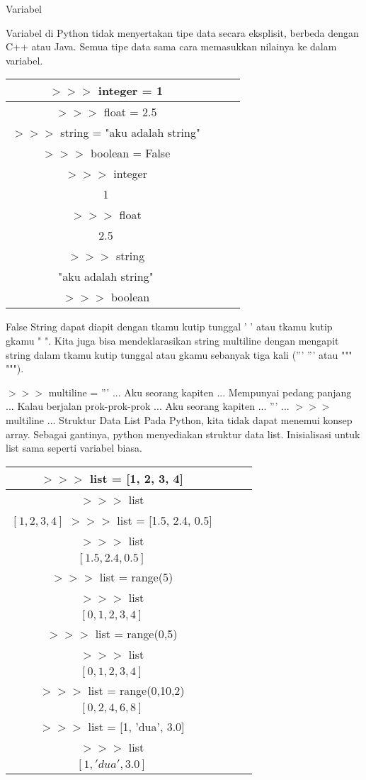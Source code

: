 Variabel

Variabel di Python tidak menyertakan tipe data secara eksplisit, berbeda dengan C++ atau Java. Semua tipe data sama cara memasukkan nilainya ke dalam variabel.

\begin{tabular}{|c|c|c|c|}
\hline
$>>>$ integer = 1 \\ \hline
$>>>$ float = 2.5 \\ \hline
$>>>$ string = "aku adalah string" \\ \hline
$>>>$ boolean = False \\ \hline
$>>>$ integer \\ \hline
1 \\ \hline
$>>>$ float \\ \hline
2.5 \\ \hline
$>>>$ string \\ \hline
"aku adalah string" \\ \hline
$>>>$ boolean \\ \hline

\end{tabular}

False  
String dapat diapit dengan tkamu kutip tunggal ' ' atau tkamu kutip gkamu " ". Kita juga bisa mendeklarasikan string multiline dengan mengapit string dalam tkamu kutip tunggal atau gkamu sebanyak tiga kali (''' ''' atau """ """).
  
$>>>$ multiline = '''
$...$ Aku seorang kapiten
$...$ Mempunyai pedang panjang
$...$ Kalau berjalan prok-prok-prok
$...$ Aku seorang kapiten
$...$ '''
$...$
$>>>$ multiline
$...$%
Struktur Data
List
Pada Python, kita tidak dapat menemui konsep array. Sebagai gantinya, python menyediakan struktur data list. Inisialisasi untuk list sama seperti variabel biasa.

\begin{tabular}{|c|c|c|c|}
\hline
$>>>$ list = [1, 2, 3, 4] \\ \hline
$>>>$ list \\ \hline
$[1, 2, 3, 4]$
$>>>$ list = [1.5, 2.4, 0.5] \\ \hline
$>>>$ list \\ \hline
$[1.5, 2.4, 0.5]$ \\ \hline

$>>>$ list = range(5) \\ \hline
$>>>$ list \\ \hline
$[0, 1, 2, 3, 4]$ \\ \hline
$>>>$ list = range(0,5) \\ \hline
$>>>$ list \\ \hline
$[0, 1, 2, 3, 4]$ \\ \hline
$>>>$ list = range(0,10,2) \\ \hline
$[0, 2, 4, 6, 8]$ \\ \hline 

$>>>$ list = [1, 'dua', 3.0] \\ \hline
$>>>$ list \\ \hline
$[1, 'dua', 3.0]$
\end{tabular}


